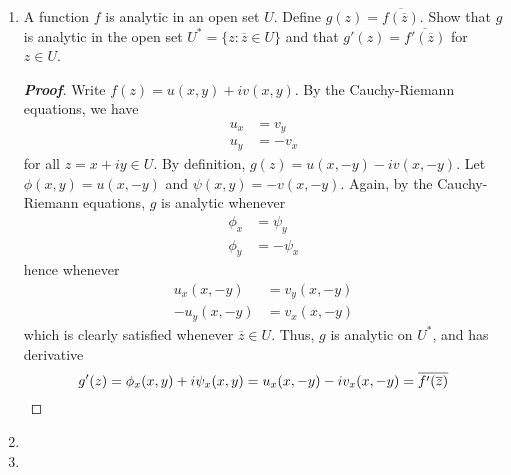\documentclass[12pt,leqno]{book}
\theoremstyle{definition}
\newenvironment{Proof}{\begin{proof}[\textnormal{\textbf{Proof}}]}{\end{proof}}
\newenvironment{Solution}{\begin{proof}[\textnormal{\textbf{Solution}}]}{\end{proof}}
\begin{document}
\begin{enumerate}
  \begin{Solution}
   By the Cauchy-Riemann equations, $f$ is differentiable when \begin{align*}3x-y&=2xy\\-x&=-y^2\end{align*} which forces $2y^3-3y^2+y=0$. Thus, $y=0,1,\frac{1}{2}$, hence $x=0,1,\frac{1}{4}$, respectively. That is, $f$ is differentiable at \begin{align*}z&=0\\z&=1+i\\z&=\frac{1}{4}+\frac{1}{2}i\end{align*} with derivative $f'(z)=3x-y+iy^2$. Thus, \begin{align*}f'(0)&=0\\f'(1+i)&=2+i\\f'\left(\frac{1}{4}+\frac{1}{2}i\right)&=\frac{1}{4}+\frac{1}{4}i\qedhere\end{align*} 
  \end{Solution}
 \item A function $f$ is analytic in an open set $U$. Define $g(z)=\overline{f(\overline{z})}$. Show that $g$ is analytic in the open set $U^*=\{z:\overline{z}\in U\}$ and that $g'(z)=\overline{f'(\overline{z})}$ for $z\in U$.
  \begin{Proof}
   Write $f(z)=u(x,y)+iv(x,y)$. By the Cauchy-Riemann equations, we have \begin{align*}u_x&=v_y\\u_y&=-v_x\end{align*} for all $z=x+iy\in U$. By definition, $g(z)=u(x,-y)-iv(x,-y)$. Let $\phi(x,y)=u(x,-y)$ and $\psi(x,y)=-v(x,-y)$. Again, by the Cauchy-Riemann equations, $g$ is analytic whenever \begin{align*}\phi_x&=\psi_y\\\phi_y&=-\psi_x\end{align*} hence whenever \begin{align*}u_x(x,-y)&=v_y(x,-y)\\-u_y(x,-y)&=v_x(x,-y)\end{align*} which is clearly satisfied whenever $\overline{z}\in U$. Thus, $g$ is analytic on $U^*$, and has derivative \[g'(z)=\phi_x(x,y)+i\psi_x(x,y)=u_x(x,-y)-iv_x(x,-y)=\overline{f'(\overline{z})}\qedhere\]
  \end{Proof}
 \item 
 \item 
\end{enumerate}
\end{document}
